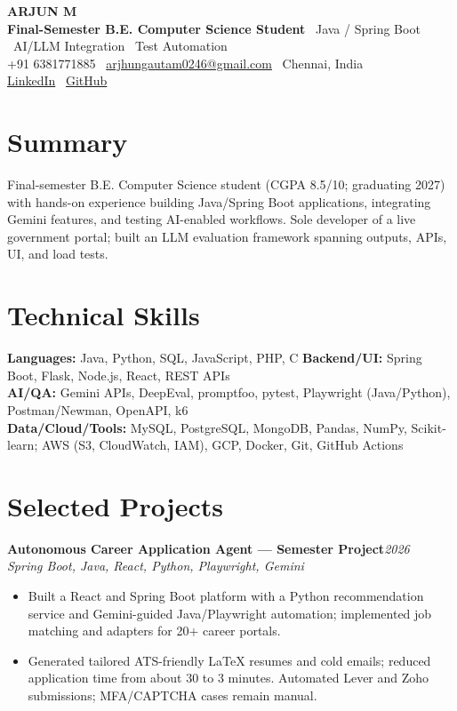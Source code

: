 \documentclass[10pt,a4paper]{extarticle}
\newcommand{\project}[2]{\textbf{#1}\hfill{\textit{#2}}\\[-2pt]}
\begin{document}
\begin{center}
{\LARGE\textbf{ARJUN M}}\\[2pt]
\textbf{Final-Semester B.E. Computer Science Student}
\textbar\ Java / Spring Boot
\textbar\ AI/LLM Integration
\textbar\ Test Automation\\[3pt]
+91 6381771885 \textbar\ \href{mailto:arjhungautam0246@gmail.com}{arjhungautam0246@gmail.com}
\textbar\ Chennai, India\\[1pt]
\href{https://www.linkedin.com/in/arjhun-m-446b4a2a1/}{LinkedIn}
\textbar\ \href{https://github.com/Arjhun0216}{GitHub}
\end{center}

\section*{Summary}
Final-semester B.E. Computer Science student (CGPA 8.5/10; graduating 2027) with hands-on experience building Java/Spring Boot applications, integrating Gemini features, and testing AI-enabled workflows. Sole developer of a live government portal; built an LLM evaluation framework spanning outputs, APIs, UI, and load tests.

\section*{Technical Skills}
\textbf{Languages:} Java, Python, SQL, JavaScript, PHP, C \quad
\textbf{Backend/UI:} Spring Boot, Flask, Node.js, React, REST APIs\\
\textbf{AI/QA:} Gemini APIs, DeepEval, promptfoo, pytest, Playwright (Java/Python), Postman/Newman, OpenAPI, k6\\
\textbf{Data/Cloud/Tools:} MySQL, PostgreSQL, MongoDB, Pandas, NumPy, Scikit-learn; AWS (S3, CloudWatch, IAM), GCP, Docker, Git, GitHub Actions

\section*{Selected Projects}
\project{Autonomous Career Application Agent --- Semester Project}{2026}
\textit{Spring Boot, Java, React, Python, Playwright, Gemini}
\begin{itemize}
  \item Built a React and Spring Boot platform with a Python recommendation service and Gemini-guided Java/Playwright automation; implemented job matching and adapters for 20+ career portals.
  \item Generated tailored ATS-friendly LaTeX resumes and cold emails; reduced application time from about 30 to 3 minutes. Automated Lever and Zoho submissions; MFA/CAPTCHA cases remain manual.
\end{itemize}
\end{document}
